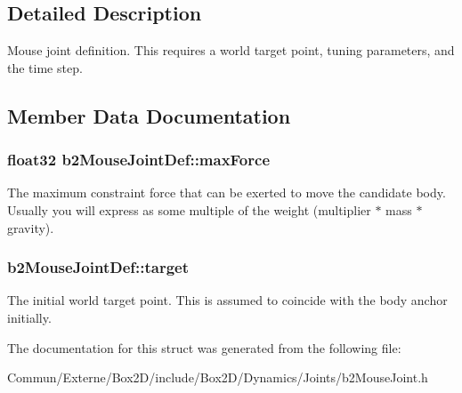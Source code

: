 \subsection{Detailed Description}
Mouse joint definition. This requires a world target point, tuning parameters, and the time step. 

\subsection{Member Data Documentation}
\subsubsection[{\texorpdfstring{max\+Force}{maxForce}}]{\setlength{\rightskip}{0pt plus 5cm}float32 b2\+Mouse\+Joint\+Def\+::max\+Force}\hypertarget{structb2_mouse_joint_def_ae9c52b3afda8ed006eb62fad163cdc3b}{}\label{structb2_mouse_joint_def_ae9c52b3afda8ed006eb62fad163cdc3b}
The maximum constraint force that can be exerted to move the candidate body. Usually you will express as some multiple of the weight (multiplier $\ast$ mass $\ast$ gravity). 
\subsubsection[{\texorpdfstring{target}{target}}]{ b2\+Mouse\+Joint\+Def\+::target}\hypertarget{structb2_mouse_joint_def_aa1b76f72df9aca8d42bdc3e9922e310a}{}\label{structb2_mouse_joint_def_aa1b76f72df9aca8d42bdc3e9922e310a}
The initial world target point. This is assumed to coincide with the body anchor initially. 

The documentation for this struct was generated from the following file\+:\begin{DoxyCompactItemize}
\item 
Commun/\+Externe/\+Box2\+D/include/\+Box2\+D/\+Dynamics/\+Joints/b2\+Mouse\+Joint.\+h\end{DoxyCompactItemize}
